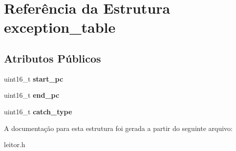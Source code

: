 \hypertarget{structexception__table}{\section{Referência da Estrutura exception\-\_\-table}
\label{structexception__table}
}
\subsection*{Atributos Públicos}
\begin{DoxyCompactItemize}
\item 
\hypertarget{structexception__table_af5b06605eecd81fe73512c8fd001cfd1}{uint16\-\_\-t {\bfseries start\-\_\-pc}}\label{structexception__table_af5b06605eecd81fe73512c8fd001cfd1}

\item 
\hypertarget{structexception__table_a89ade5c549c9ef70d35df9601c71f6e6}{uint16\-\_\-t {\bfseries end\-\_\-pc}}\label{structexception__table_a89ade5c549c9ef70d35df9601c71f6e6}

\item 
\hypertarget{structexception__table_abb24ce48092e41e0cc5249d0c957fa94}{uint16\-\_\-t {\bfseries catch\-\_\-type}}\label{structexception__table_abb24ce48092e41e0cc5249d0c957fa94}

\end{DoxyCompactItemize}


A documentação para esta estrutura foi gerada a partir do seguinte arquivo\-:\begin{DoxyCompactItemize}
\item 
leitor.\-h\end{DoxyCompactItemize}
